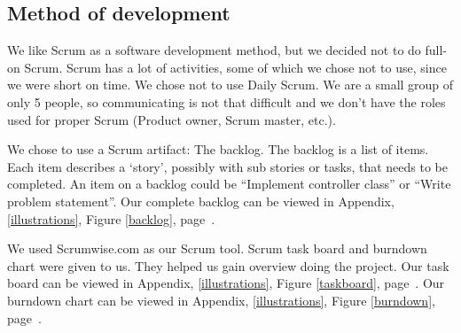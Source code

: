 \subsection{Method of development}
We like Scrum as a software development method, but we decided not to do full-on Scrum. Scrum has a lot of activities, some of which we chose not to use, since we were short on time. We chose not to use Daily Scrum. We are a small group of only 5 people, so communicating is not that difficult and we don't have the roles used for proper Scrum (Product owner, Scrum master, etc.).

We chose to use a Scrum artifact: The backlog. The backlog is a list of items. Each item describes a `story', possibly with sub stories or tasks, that needs to be completed. An item on a backlog could be ``Implement controller class'' or ``Write problem statement''. Our complete backlog can be viewed in Appendix, \ref{illustrations}, Figure \ref{backlog}, page~\pageref{backlog}.

We used Scrumwise.com as our Scrum tool. Scrum task board and burndown chart were given to us. They helped us gain overview doing the project. Our task board can be viewed in Appendix, \ref{illustrations}, Figure \ref{taskboard}, page~\pageref{taskboard}. Our burndown chart can be viewed in Appendix, \ref{illustrations}, Figure \ref{burndown}, page~\pageref{burndown}.